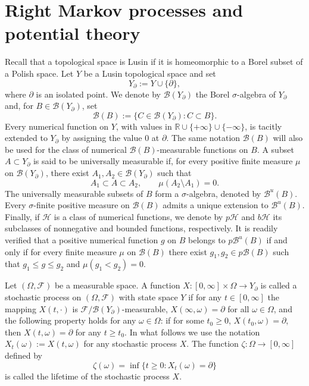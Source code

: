 \documentclass[11pt,a4paper,reqno]{amsart}
\theoremstyle{definition}
\numberwithin{equation}{section}
\begin{document}
\section{Right Markov processes and  potential theory}
\label{sec2}

Recall that a topological space is Lusin if it is homeomorphic to a Borel subset of a Polish space. 
Let $Y$ be a Lusin topological space and set
\[
Y_\partial:=Y\cup\{\partial\},
\]
where $\partial$ is an isolated point. We denote by $\mathcal{B}(Y_\partial)$ the Borel $\sigma$-algebra of 
$ Y_{\partial}$ and, for $B\in \mathcal{B}(Y_\partial)$, set
\[
\mathcal B(B):=\{C\in\mathcal B(Y_\partial): C\subset B\}.
\]
Every numerical function on $Y$, with values in
$\mathbb R\cup\{+\infty\}\cup\{-\infty\}$, is tacitly extended to $Y_\partial$  by assigning the value $0$ at $\partial$. 
The same notation $\mathcal B(B)$ will also be used for the class of numerical $\mathcal B(B)$-measurable functions on $B$.
A subset $A\subset Y_\partial$ is said to be universally measurable if, for every positive finite measure $\mu$ 
on $\mathcal B(Y_\partial)$, there exist $A_1,A_2\in\mathcal B(Y_\partial)$ such that
\[
A_1\subset A\subset A_2,
\qquad
\mu(A_2\setminus A_1)=0.
\]
The universally measurable subsets of  $B$ form a $\sigma$-algebra, denoted by $\mathcal{B}^u(B)$. 
Every $\sigma$-finite positive measure on $\mathcal B(B)$ admits a unique extension to $\mathcal B^u(B)$. 
Finally, if $\mathcal H$ is a class of numerical functions, we denote by $p\mathcal H$ and $b\mathcal H$ 
its subclasses of nonnegative and  bounded functions, respectively.
It is readily verified that a positive numerical function   $g$ on $B$  belongs to $p \mathcal{B}^u(B)$
 if and only if for every finite measure $\mu$ on $\mathcal{B}(B)$ there exist  
 $g_1, g_2 \in p \mathcal{B}(B)$ such that $g_1 \leq g \leq g_2$ and $\mu(g_1<g_2)=0$.

Let $(\Omega, \mathcal{F})$ be a measurable space. 
A function $X:[0,\infty]\times\Omega\to Y_\partial$ is called a  stochastic process on 
$(\Omega, \mathcal{F})$ with state space $Y$ if for any  $t\in [0,\infty]$ the mapping 
$X(t,\cdot)$ is  $\mathcal{F} / \mathcal{B}(Y_\partial)$-measurable,  
$X(\infty,\omega)=\partial$ for all $\omega \in \Omega$, 
and the following property holds for any $\omega\in\Omega$:  
if  for some $t_0\ge 0$, $X(t_0,\omega)=\partial$,  then $X(t,\omega)=\partial$ 
for any  $t\ge t_0$. In what follows we use the notation $X_{t}(\omega):= X(t,\omega)$
for any stochastic process $X$. The function $\zeta: \Omega \longrightarrow[0, \infty]$ defined by 
\[
\zeta(\omega)=\inf \{t\ge 0: X_t(\omega)=\partial\}
\]
is called the lifetime of the stochastic process $X$.
\end{document}
